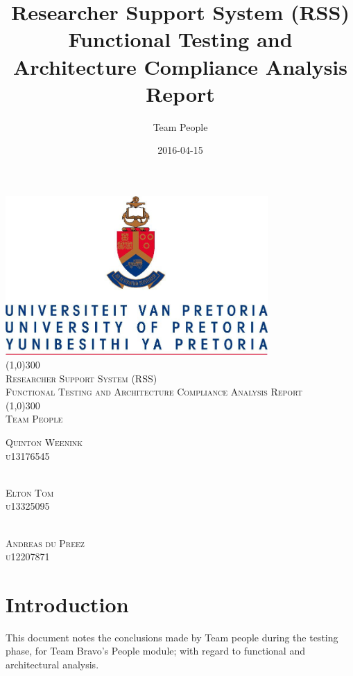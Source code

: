 \documentclass{article}
\title{
Researcher Support System (RSS)\\
Functional Testing and Architecture Compliance Analysis Report
}
\date{2016-04-15}
\author{Team People}
\begin{document}
\begin{titlepage}
	\begin{center}
		\includegraphics[width=10cm]{UP.jpg}  \\
		[1cm]
		\line(1,0){300} \\
		[0.3cm]
		\textsc{\Large
			Researcher Support System (RSS)\\
			Functional Testing and Architecture Compliance Analysis Report
		}\\
		[0.1cm]
		\line(1,0){300} \\
		[0.4cm]
		\textsc{\Large
			Team People
		} \\

	\end{center}
	\begin{flushright}
	\textsc{\Large
	Quinton Weenink\\ 
	u13176545\\
	}
	
	\textsc{\large\\
	Elton Tom\\ 
	u13325095\\ 
	}
	
	\textsc{\large\\
		Andreas du Preez\\ 
		u12207871\\ 
	}
	
	\end{flushright}
\end{titlepage}

\tableofcontents
\thispagestyle{empty}
\cleardoublepage

\setcounter{page}{1}
\section{Introduction}
This document notes the conclusions made by Team people during the testing phase, for Team Bravo's People module; with regard to functional and architectural analysis. \\
\end{document}
